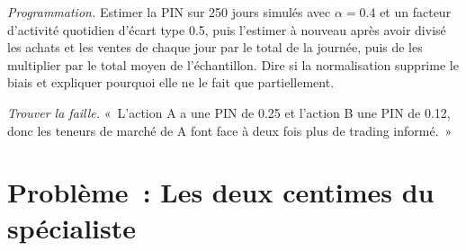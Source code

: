 \begin{exercise}[$\star\star\star$]\label{exo:mx:why-there-is-a-spread:7}
\emph{Programmation.} Estimer la PIN sur 250 jours simulés avec $\alpha=0.4$ et un facteur d'activité quotidien d'écart type 0.5, puis l'estimer à nouveau après avoir divisé les achats et les ventes de chaque
jour par le total de la journée, puis de les multiplier par le total moyen de l'échantillon. Dire si la normalisation supprime le biais et expliquer pourquoi elle ne le fait que partiellement.
\end{exercise}

\begin{exercise}[$\star\star\star$]\label{exo:mx:why-there-is-a-spread:8}
\emph{Trouver la faille.} «~L'action A a une PIN de 0.25 et l'action B une PIN de 0.12, donc les teneurs de marché de A font face à deux fois plus de trading informé.~»
\end{exercise}

\section{Problème~: Les deux centimes du spécialiste}

